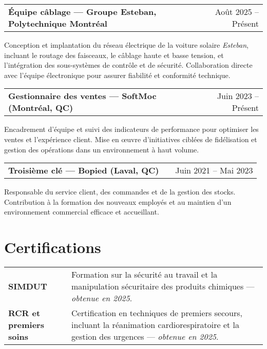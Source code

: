 \documentclass[a4paper,12pt]{article}
\makeatletter
\newenvironment{jobshort}[2]
    {
    \begin{tabularx}{\linewidth}{@{}l X r@{}}
    \textbf{#1} & \hfill &  #2 \\[3.75pt]
    \end{tabularx}
    }
    {
    }
\makeatother
\begin{document}
\begin{jobshort}{\textbf{Équipe câblage} — Groupe Esteban, Polytechnique Montréal}{Août 2025 -- Présent}
Conception et implantation du réseau électrique de la voiture solaire \textit{Esteban}, incluant le routage des faisceaux, le câblage haute et basse tension, et l’intégration des sous-systèmes de contrôle et de sécurité. Collaboration directe avec l’équipe électronique pour assurer fiabilité et conformité technique. 
\end{jobshort}

\begin{jobshort}{\textbf{Gestionnaire des ventes} — SoftMoc (Montréal, QC)}{Juin 2023 -- Présent}
Encadrement d’équipe et suivi des indicateurs de performance pour optimiser les ventes et l’expérience client. 
Mise en œuvre d’initiatives ciblées de fidélisation et gestion des opérations dans un environnement à haut volume. 
\end{jobshort}

\begin{jobshort}{\textbf{Troisième clé} — Bopied (Laval, QC)}{Juin 2021 -- Mai 2023}
Responsable du service client, des commandes et de la gestion des stocks. 
Contribution à la formation des nouveaux employés et au maintien d’un environnement commercial efficace et accueillant. 
\end{jobshort}
\vspace{1.2em}




\section{Certifications}

\begin{tabularx}{\linewidth}{@{}p{4.3cm} X@{}}

\textbf{SIMDUT} &
Formation sur la sécurité au travail et la manipulation sécuritaire des produits chimiques — \textit{obtenue en 2025}. \\[0.4em]

\textbf{RCR et     premiers soins } &
Certification en techniques de premiers secours, incluant la réanimation cardiorespiratoire et la gestion des urgences — \textit{obtenue en 2025}. \\

\end{tabularx}

\vfill
\end{document}
